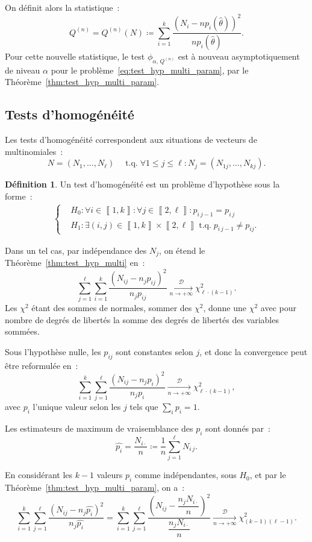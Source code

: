 \documentclass{report}
\DeclareMathOperator{\tq}{\text{ t.q. }}
\newcommand{\pinfty}{{+\infty}}
\newcommand{\cvgd}{\xrightarrow[n \to \pinfty]{\mathcal D}}
\newcommand{\intint}[2]{\left\llbracket#1, #2\right\rrbracket}
\newcommand{\n}{{(n)}}
\theoremstyle{definition}
\newtheorem{déf}[thm]{Définition}
\theoremstyle{remark}
\begin{document}
			On définit alors la statistique~:
			\[Q^\n = Q^\n(N) \coloneqq \sum_{i=1}^k\frac {(N_i - np_i(\hat \theta))^2}{np_i(\hat \theta)}.\]
			Pour cette nouvelle statistique, le test $\phi_{\alpha,\,Q^\n}$ est à nouveau asymptotiquement de niveau $\alpha$ pour le
			problème~\eqref{eq:test_hyp_multi_param}, par le Théorème~\ref{thm:test_hyp_multi_param}.

		\subsection{Tests d'homogénéité}
			Les tests d'homogénéité correspondent aux situations de vecteurs de multinomiales~:
			\[N = (N_1, \ldots, N_\ell) \quad \tq \forall 1 \leq j \leq \ell : N_j = (N_{1j}, \ldots, N_{kj}).\]

			\begin{déf} Un test d'homogénéité est un problème d'hypothèse sous la forme~:
			\begin{align}\label{eq:test_hyp_homo}
				\begin{cases}
					&H_0 : \forall i \in \intint 1k : \forall j \in \intint 2\ell : p_{i\,j-1} = p_{i\,j} \\
					&H_1 : \exists (i, j) \in \intint 1k \times \intint 2\ell \tq p_{i\,j-1} \neq p_{ij}.
				\end{cases}
			\end{align}
			\end{déf}

			Dans un tel cas, par indépendance des $N_j$, on étend le Théorème~\ref{thm:test_hyp_multi} en~:
			\[\sum_{j=1}^\ell\sum_{i=1}^k\frac {(N_{ij} - n_jp_{ij})^2}{n_jp_{ij}} \cvgd \chi^2_{\ell \cdot (k-1)}.\]
			Les $\chi^2$ étant des sommes de normales, sommer des $\chi^2$, donne une $\chi^2$ avec pour nombre de degrés de libertés la somme des degrés de
			libertés des variables sommées.

			Sous l'hypothèse nulle, les $p_{ij}$ sont constantes selon $j$, et donc la convergence peut être reformulée en~:
			\[\sum_{i=1}^k\sum_{j=1}^\ell \frac {(N_{ij}-n_jp_i)^2}{n_jp_i} \cvgd \chi^2_{\ell \cdot (k-1)},\]
			avec $p_i$ l'unique valeur selon les $j$ tels que $\sum_ip_i = 1$.

			Les estimateurs de maximum de vraisemblance des $p_i$ sont donnés par~:
			\[\hat {p_i} = \frac {N_{i\cdot}}n \coloneqq \frac 1n\sum_{j=1}^\ell N_{i\,j}.\]

			En considérant les $k-1$ valeurs $p_i$ comme indépendantes, sous $H_0$, et par le Théorème~\ref{thm:test_hyp_multi_param}, on a~:
			\[\sum_{i=1}^k\sum_{j=1}^\ell\frac {(N_{ij} - n_j\hat {p_i})^2}{n_j\hat {p_i}}
				= \sum_{i=1}^k\sum_{j=1}^\ell \frac {\left(N_{ij} - \dfrac {n_jN_{i\cdot}}n\right)^2}{\dfrac {n_jN_{i\cdot}}n} \cvgd \chi^2_{(k-1)(\ell-1)}.\]
\end{document}
